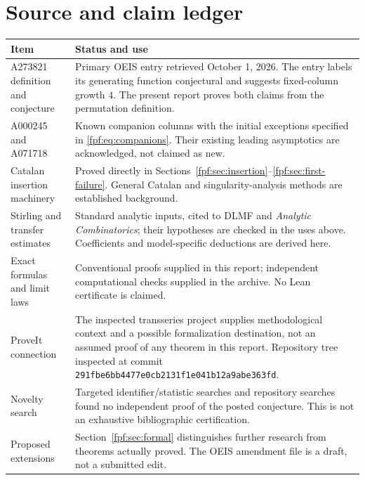 \documentclass[11pt]{article}
\numberwithin{equation}{section}
\theoremstyle{definition}
\begin{document}
\section{Source and claim ledger}
\begin{longtable}{>{\raggedright\arraybackslash}p{}>{\raggedright\arraybackslash}p{}}
\toprule
Item & Status and use\\
\midrule
\endhead
A273821 definition and conjecture & Primary OEIS entry retrieved October 1,
2026. The entry labels its generating function conjectural and suggests
fixed-column growth $4$. The present report proves both claims from the
permutation definition.\\[4pt]
A000245 and A071718 & Known companion columns with the initial exceptions
specified in \eqref{fpf:eq:companions}. Their existing leading asymptotics are
acknowledged, not claimed as new.\\[4pt]
Catalan insertion machinery & Proved directly in Sections~\ref{fpf:sec:insertion}--\ref{fpf:sec:first-failure}. General
Catalan and singularity-analysis methods are established background.\\[4pt]
Stirling and transfer estimates & Standard analytic inputs, cited to DLMF
and \emph{Analytic Combinatorics}; their hypotheses are checked in the uses
above. Coefficients and model-specific deductions are derived here.\\[4pt]
Exact formulas and limit laws & Conventional proofs supplied in this report;
independent computational checks supplied in the archive. No Lean certificate
is claimed.\\[4pt]
ProveIt connection & The inspected transseries project supplies methodological
context and a possible formalization destination, not an assumed proof of
any theorem in this report. Repository tree inspected at commit
\texttt{291fbe6bb4477e0cb2131f1e041b12a9abe363fd}.\\[4pt]
Novelty search & Targeted identifier/statistic searches and repository searches
found no independent proof of the posted conjecture. This is not an exhaustive
bibliographic certification.\\[4pt]
Proposed extensions & Section~\ref{fpf:sec:formal} distinguishes further research from theorems
actually proved. The OEIS amendment file is a draft, not a submitted edit.\\
\bottomrule
\end{longtable}
\end{document}
